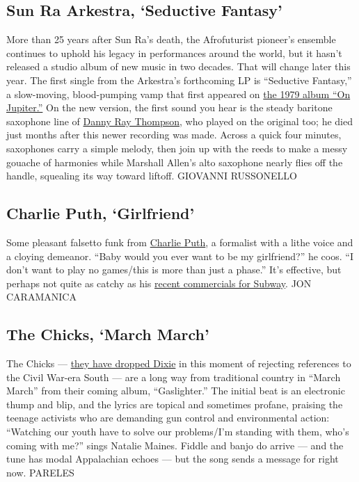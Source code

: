\hypertarget{sun-ra-arkestra-seductive-fantasy}{%
\subsection{Sun Ra Arkestra, `Seductive
Fantasy'}\label{sun-ra-arkestra-seductive-fantasy}}

More than 25 years after Sun Ra's death, the Afrofuturist pioneer's
ensemble continues to uphold his legacy in performances around the
world, but it hasn't released a studio album of new music in two
decades. That will change later this year. The first single from the
Arkestra's forthcoming LP is ``Seductive Fantasy,'' a slow-moving,
blood-pumping vamp that first appeared on
\href{https://www.youtube.com/watch?v=fyTdUr1u9ok}{the 1979 album ``On
Jupiter.''} On the new version, the first sound you hear is the steady
baritone saxophone line of
\href{https://www.nytimes.com/2020/03/20/arts/music/danny-ray-thompson-dead.html}{Danny
Ray Thompson}, who played on the original too; he died just months after
this newer recording was made. Across a quick four minutes, saxophones
carry a simple melody, then join up with the reeds to make a messy
gouache of harmonies while Marshall Allen's alto saxophone nearly flies
off the handle, squealing its way toward liftoff. GIOVANNI RUSSONELLO

\hypertarget{charlie-puth-girlfriend}{%
\subsection{Charlie Puth, `Girlfriend'}\label{charlie-puth-girlfriend}}

Some pleasant falsetto funk from
\href{https://www.nytimes.com/2018/05/16/arts/music/charlie-puth-voicenotes-interview.html}{Charlie
Puth}, a formalist with a lithe voice and a cloying demeanor. ``Baby
would you ever want to be my girlfriend?'' he coos. ``I don't want to
play no games/this is more than just a phase.'' It's effective, but
perhaps not quite as catchy as his
\href{https://www.youtube.com/watch?v=JD61F6SNkTo}{recent commercials
for Subway}. JON CARAMANICA

\hypertarget{the-chicks-march-march}{%
\subsection{The Chicks, `March March'}\label{the-chicks-march-march}}

The Chicks ---
\href{https://www.nytimes.com/2020/06/25/arts/music/dixie-chicks-change-name.html}{they
have dropped Dixie} in this moment of rejecting references to the Civil
War-era South --- are a long way from traditional country in ``March
March'' from their coming album, ``Gaslighter.'' The initial beat is an
electronic thump and blip, and the lyrics are topical and sometimes
profane, praising the teenage activists who are demanding gun control
and environmental action: ``Watching our youth have to solve our
problems/I'm standing with them, who's coming with me?'' sings Natalie
Maines. Fiddle and banjo do arrive --- and the tune has modal
Appalachian echoes --- but the song sends a message for right now.
PARELES

